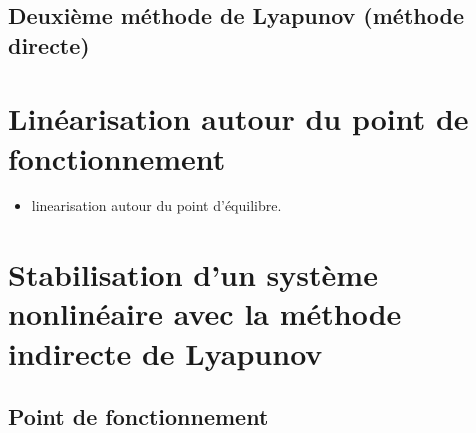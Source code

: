 \subsection{Deuxième méthode de Lyapunov (méthode directe)}
\section{Linéarisation autour du point de fonctionnement}

\begin{itemize}
	\item linearisation autour du point d'équilibre.
\end{itemize}


\section{Stabilisation d'un système nonlinéaire avec la méthode indirecte de Lyapunov}
\subsection{Point de fonctionnement}